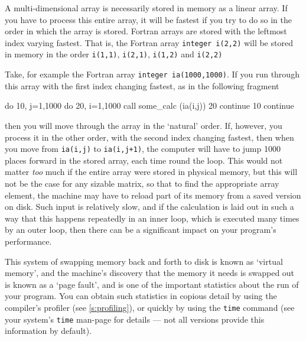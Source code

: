\documentclass[11pt,oneside,chapters]{starlink}
\begin{document}
A multi-dimensional array is necessarily stored in
memory as a linear array.  If you have to process this
entire array, it will be fastest if you try to do so in
the order in which the array is stored.  Fortran arrays
are stored with the leftmost index varying fastest.
That is, the Fortran array \texttt{integer i(2,2)}
will be stored in memory in the order
\texttt{i(1,1)}, 
\texttt{i(2,1)},
\texttt{i(1,2)} and
\texttt{i(2,2)}

Take,
for example the Fortran array \texttt{integer ia(1000,1000)}.
If you run through this array
with the first index changing fastest, as in the
following fragment

\begin{terminalv}
      do 10, j=1,1000
        do 20, i=1,1000
          call some_calc (ia(i,j))
   20   continue
   10 continue
\end{terminalv}

then
you will move through the array in the `natural' order.
If, however, you process it in the other order, with the
second index changing fastest, then when you move from
\texttt{ia(i,j)} to \texttt{ia(i,j+1)}, the
computer will have to jump 1000 places forward in the
stored array, each time round the loop.  This would not
matter \emph{too} much if the entire array were stored
in physical memory, but this will not be the case for
any sizable matrix, so that to find the appropriate
array element, the machine may have to reload part of
its memory from a saved version on disk.  Such input is
relatively slow, and if the calculation is laid out in
such a way that this happens repeatedly in an inner
loop, which is executed many times by an outer loop,
then there can be a significant impact on your program's
performance.

This system of swapping memory back
and forth to disk is known as `virtual memory', and the
machine's discovery that the memory it needs is swapped
out is known as a `page fault', and is one of the
important statistics about the run of your program.  You
can obtain such statistics in copious detail by using
the compiler's profiler (see \ref{s:profiling}),
or quickly by using the \texttt{time} command (see
your system's \texttt{time} man-page for details ---
not all versions provide this information by default).
\end{document}
